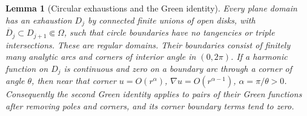 \documentclass[11pt,a4paper,openany]{book}
\newtheorem{lemma}[theorem]{Lemma}
\theoremstyle{definition}
\theoremstyle{remark}\newtheorem{remark}[theorem]{Remark}
\begin{document}
\begin{lemma}[Circular exhaustions and the Green identity]\label{d12:14:circular-exhaustion}
Every plane domain has an exhaustion $D_j$ by connected finite unions of open disks, with $\overline D_j\subset D_{j+1}\Subset\Omega$, such that circle boundaries have no tangencies or triple intersections. These are regular domains. Their boundaries consist of finitely many analytic arcs and corners of interior angle in $(0,2\pi)$. If a harmonic function on $D_j$ is continuous and zero on a boundary arc through a corner of angle $\theta$, then near that corner
$u=O(r^{\alpha})$, $\nabla u=O(r^{\alpha-1})$, $\alpha=\pi/\theta>0$.
Consequently the second Green identity applies to pairs of their Green functions after removing poles and corners, and its corner boundary terms tend to zero.
\end{lemma}
\end{document}

